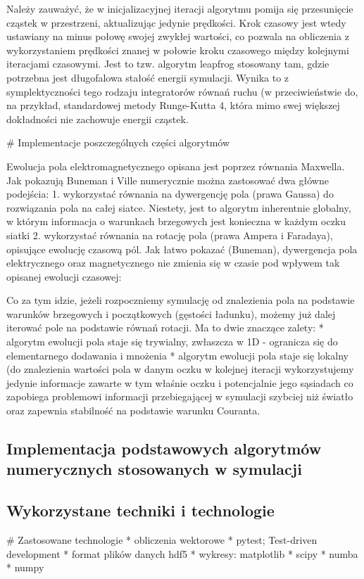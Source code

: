 Należy zauważyć, że w inicjalizacyjnej iteracji algorytmu pomija się przesunięcie cząstek w przestrzeni, aktualizując jedynie
prędkości. Krok czasowy jest wtedy ustawiany na minus połowę swojej zwykłej wartości, co pozwala na obliczenia
z wykorzystaniem prędkości znanej w połowie kroku czasowego między kolejnymi iteracjami czasowymi. Jest to tzw. algorytm
leapfrog %
stosowany tam, gdzie potrzebna jest długofalowa stałość energii symulacji. Wynika to z symplektyczności %
tego rodzaju integratorów równań ruchu (w przeciwieństwie do, na przykład, standardowej metody Runge-Kutta 4, która
mimo swej większej dokładności nie zachowuje energii cząstek.

# Implementacje poszczególnych części algorytmów

Ewolucja pola elektromagnetycznego opisana jest poprzez równania Maxwella. Jak pokazują Buneman i Ville %
numerycznie można zastosować dwa główne podejścia: %
1. wykorzystać równania na dywergencję pola (prawa Gaussa) do rozwiązania pola na całej siatce. Niestety, jest to
algorytm inherentnie globalny, w którym informacja o warunkach brzegowych jest konieczna w każdym oczku siatki
2. wykorzystać równania na rotację pola (prawa Ampera i Faradaya), opisujące ewolucję czasową pól. Jak łatwo pokazać (Buneman),
dywergencja pola elektrycznego oraz magnetycznego nie zmienia się w czasie pod wpływem tak opisanej ewolucji czasowej:

Co za tym idzie, jeżeli rozpoczniemy symulację od znalezienia pola na podstawie warunków brzegowych i początkowych (gęstości
ładunku), możemy już dalej iterować pole na podstawie równań rotacji. Ma to dwie znaczące zalety:
* algorytm ewolucji pola staje się trywialny, zwłaszcza w 1D - ogranicza się do elementarnego dodawania i mnożenia %
* algorytm ewolucji pola staje się lokalny (do znalezienia wartości pola w danym oczku w kolejnej iteracji wykorzystujemy
jedynie informacje zawarte w tym właśnie oczku i potencjalnie jego sąsiadach %
co zapobiega problemowi informacji przebiegającej w symulacji szybciej niż światło oraz zapewnia stabilność na podstawie
warunku Couranta.
\subsection{Implementacja podstawowych algorytmów numerycznych stosowanych w symulacji}
\subsection{Wykorzystane techniki i technologie}
# Zastosowane technologie
* obliczenia wektorowe
* pytest; Test-driven development
* format plików danych hdf5
* wykresy: matplotlib
* scipy
* numba
* numpy

